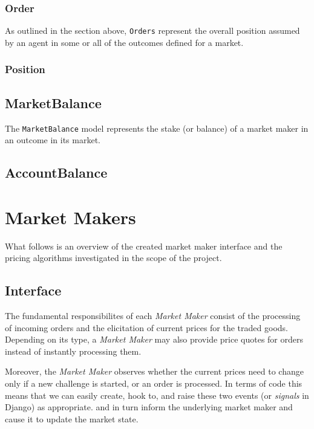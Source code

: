 \documentclass[bsc,frontabs,twoside,singlespacing,parskip,deptreport]{infthesis}     %
\begin{document}
\subsubsection{Order}

	As outlined in the section above, {\tt Orders} represent the overall position assumed by an agent in some or all of the outcomes defined for a market. 


\subsubsection{Position}

\subsection{MarketBalance}

	The {\tt MarketBalance} model represents the stake (or balance) of a market maker in an outcome in its market. 

\subsection{AccountBalance}


\section{Market Makers}
    What follows is an overview of the created market maker interface and the pricing algorithms investigated in the scope of the project.

\subsection{Interface}

The fundamental responsibilites of each {\em Market Maker} consist of the processing of incoming orders and the elicitation of current prices for the traded goods. Depending on its type, a {\em Market Maker} may also provide price quotes for orders instead of instantly processing them. 

Moreover, the {\em Market Maker} observes whether the current prices need to change only if a new challenge is started, or an order is processed. In terms of code this means that we can easily create, hook to, and raise these two events (or {\it signals} in Django) as appropriate.   and in turn inform the underlying market maker and cause it to update the market state.  
\end{document}
